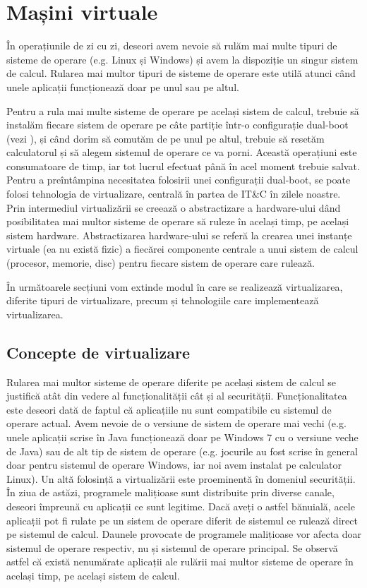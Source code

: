 \chapter{Mașini virtuale}
\label{chapter:vm}

În operațiunile de zi cu zi, deseori avem nevoie să rulăm mai multe tipuri de
sisteme de operare (e.g. Linux și Windows) și avem la dispoziție un singur
sistem de calcul. Rularea mai multor tipuri de sisteme de operare este utilă
atunci când unele aplicații funcționează doar pe unul sau pe altul.

Pentru a rula mai multe sisteme de operare pe același sistem de calcul, trebuie
să instalăm fiecare sistem de operare pe câte partiție într-o configurație
dual-boot (vezi ), și când dorim să
comutăm de pe unul pe altul, trebuie să resetăm calculatorul și să alegem
sistemul de operare ce va porni. Această operațiuni este consumatoare de timp,
iar tot lucrul efectuat până în acel moment trebuie salvat. Pentru a
preîntâmpina necesitatea folosirii unei configurații dual-boot, se poate folosi
tehnologia de virtualizare, centrală în partea de IT\&C în zilele noastre. Prin
intermediul virtualizării se creează o abstractizare a hardware-ului dând
posibilitatea mai multor sisteme de operare să ruleze în același timp, pe
același sistem hardware. Abstractizarea hardware-ului se referă la crearea unei
instanțe virtuale (ea nu există fizic) a fiecărei componente centrale a unui
sistem de calcul (procesor, memorie, disc) pentru fiecare sistem de operare care
rulează.

În următoarele secțiuni vom extinde modul în care se realizează virtualizarea,
diferite tipuri de virtualizare, precum și tehnologiile care implementează
virtualizarea.

\section{Concepte de virtualizare}
\label{sec:vm-intro}

Rularea mai multor sisteme de operare diferite pe același sistem de calcul se
justifică atât din vedere al funcționalității cât și al securității.
Funcționalitatea este deseori dată de faptul că aplicațiile nu sunt compatibile
cu sistemul de operare actual. Avem nevoie de o versiune de sistem de operare
mai vechi (e.g. unele aplicații scrise în Java funcționează doar pe Windows 7 cu
o versiune veche de Java) sau de alt tip de sistem de operare (e.g. jocurile au
fost scrise în general doar pentru sistemul de operare Windows, iar noi avem
instalat pe calculator Linux). Un altă folosință a virtualizării este
proeminentă în domeniul securității. În ziua de astăzi, programele malițioase
sunt distribuite prin diverse canale, deseori împreună cu aplicații ce sunt
legitime. Dacă aveți o astfel bănuială, acele aplicații pot fi rulate pe un
sistem de operare diferit de sistemul ce rulează direct pe sistemul de calcul.
Daunele provocate de programele malițioase vor afecta doar sistemul de operare
respectiv, nu și sistemul de operare principal. Se observă astfel că există
nenumărate aplicații ale rulării mai multor sisteme de operare în același timp,
pe același sistem de calcul.

